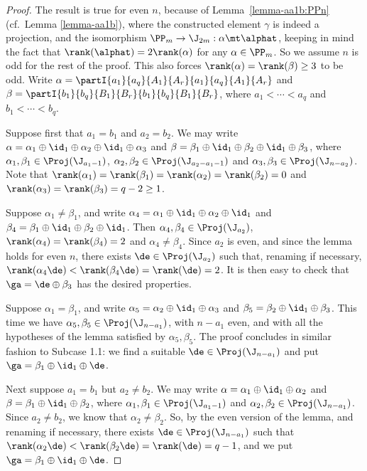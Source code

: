 \begin{proof} The result is true for even $n$, because of Lemma~\ref{lemma-aa1b:PPn} (cf.~Lemma \ref{lemma-aa1b}), where the constructed element $\gamma$ is indeed a projection, and the isomorphism ${\PP_m\to\J_{2m}:\alpha\mt\alphat}$, keeping in mind the fact that $\rank(\alphat)=2\rank(\alpha)$ for any $\alpha\in\PP_m$.  So we assume $n$ is odd for the rest of the proof.  This also forces $\rank(\alpha)=\rank(\beta)\geq3$ to be odd. Write $\alpha=\partI{a_1}{a_q}{A_1}{A_r}{a_1}{a_q}{A_1}{A_r}$ and $\beta=\partI{b_1}{b_q}{B_1}{B_r}{b_1}{b_q}{B_1}{B_r}$, where $a_1<\cdots<a_q$ and $b_1<\cdots<b_q$.  



\bigskip{}  Suppose first that $a_1=b_1$ and $a_2=b_2$.  We may write $\alpha=\alpha_1\oplus\id_1\oplus\alpha_2\oplus\id_1\oplus\alpha_3$ and $\beta=\beta_1\oplus\id_1\oplus\beta_2\oplus\id_1\oplus\beta_3$, where $\alpha_1,\beta_1\in\Proj(\J_{a_1-1})$, $\alpha_2,\beta_2\in\Proj(\J_{a_2-a_1-1})$ and $\alpha_3,\beta_3\in\Proj(\J_{n-a_2})$.
%
Note that $\rank(\alpha_1)=\rank(\beta_1)=\rank(\alpha_2)=\rank(\beta_2)=0$ and $\rank(\alpha_3)=\rank(\beta_3)=q-2\geq1$.

\bigskip{}  Suppose $\alpha_1\not=\beta_1$, and write $\alpha_4=\alpha_1\oplus\id_1\oplus\alpha_2\oplus\id_1$ and $\beta_4=\beta_1\oplus\id_1\oplus\beta_2\oplus\id_1$.  Then $\alpha_4,\beta_4\in\Proj(\J_{a_2})$, $\rank(\alpha_4)=\rank(\beta_4)=2$ and $\alpha_4\not=\beta_4$.  Since $a_2$ is even, and since the lemma holds for even $n$, there exists $\de\in\Proj(\J_{a_2})$ such that, renaming if necessary, $\rank(\alpha_4\de)<\rank(\beta_4\de)=\rank(\de)=2$.  It is then easy to check that $\ga=\de\oplus\beta_3$ has the desired properties.

\bigskip{}  Suppose $\alpha_1=\beta_1$, and write $\alpha_5=\alpha_2\oplus\id_1\oplus\alpha_3$ and $\beta_5=\beta_2\oplus\id_1\oplus\beta_3$.  This time we have $\alpha_5,\beta_5\in\Proj(\J_{n-a_1})$, with $n-a_1$ even, and with all the hypotheses of the lemma satisfied by $\alpha_5,\beta_5$.  The proof concludes in similar fashion to Subcase 1.1: we find a suitable $\de\in\Proj(\J_{n-a_1})$ and put $\ga=\beta_1\oplus\id_1\oplus\de$.

\bigskip{}  Next suppose $a_1=b_1$ but $a_2\not=b_2$.  We may write $\alpha=\alpha_1\oplus\id_1\oplus\alpha_2$ and $\beta=\beta_1\oplus\id_1\oplus\beta_2$, where $\alpha_1,\beta_1\in\Proj(\J_{a_1-1})$ and $\alpha_2,\beta_2\in\Proj(\J_{n-a_1})$.  Since $a_2\not=b_2$, we know that $\alpha_2\not=\beta_2$.  So, by the even version of the lemma, and renaming if necessary, there exists $\de\in\Proj(\J_{n-a_1})$ such that $\rank(\alpha_2\de)<\rank(\beta_2\de)=\rank(\de)=q-1$, and we put $\ga=\beta_1\oplus\id_1\oplus\de$.




\end{proof}
